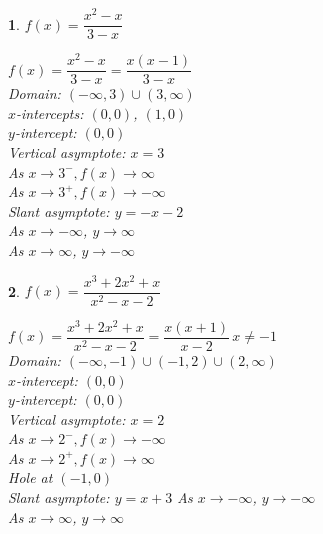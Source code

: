 \documentclass{amsbook}
\newtheorem{exc}{}
\newenvironment{ex}{\begin{exc}\normalfont}{\end{exc}}
\numberwithin{section}{chapter}
\numberwithin{equation}{chapter}
\begin{document}
\begin{multicols}{2}
\begin{ex}
			$f(x) = \dfrac{x^2-x}{3-x}$
	\begin{sol}
		$f(x) = \dfrac{x^2-x}{3-x} = \dfrac{x(x-1)}{3-x}$\\
		Domain: $(-\infty, 3) \cup (3, \infty)$\\
		$x$-intercepts:  $(0,0)$, $(1,0)$\\
		$y$-intercept:  $(0,0)$\\
		Vertical asymptote: $x = 3$\\
		As $x \rightarrow 3^{-}, f(x) \rightarrow \infty$\\
		As $x \rightarrow 3^{+}, f(x) \rightarrow -\infty$\\
		Slant asymptote: $y = -x-2$ \\
		As $x \rightarrow -\infty$, $y\to \infty$\\
		As $x \rightarrow \infty$, $y\to -\infty$

	\end{sol}
\end{ex}

\begin{ex}
	$f(x) = \dfrac{x^3+2x^2+x}{x^{2} -x-2} $
	\begin{sol}
		$f(x) = \dfrac{x^3+2x^2+x}{x^{2} -x-2} = \dfrac{x(x+1)}{x - 2} \, x \neq -1$\\
		Domain: $(-\infty, -1) \cup (-1, 2) \cup (2, \infty)$\\
		$x$-intercept:  $(0,0)$\\
		$y$-intercept:  $(0,0)$\\
		Vertical asymptote: $x = 2$\\
		As $x \rightarrow 2^{-}, f(x) \rightarrow -\infty$\\
		As $x \rightarrow 2^{+}, f(x) \rightarrow \infty$\\
		Hole at $(-1,0)$ \\
		Slant asymptote: $y = x+3$
		As $x \rightarrow -\infty$, $y\to -\infty$\\
As $x \rightarrow \infty$, $y\to \infty$
	\end{sol}
\end{ex}


\end{multicols}
\end{document}
